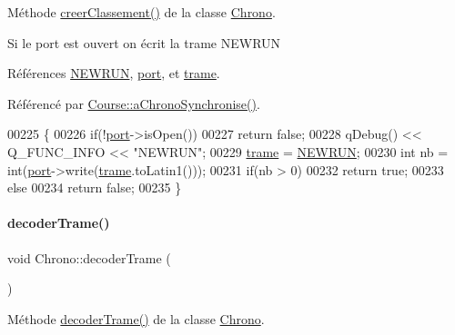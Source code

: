 Méthode \hyperlink{class_chrono_a0d7e3e50fcef0f2b0b7bfadc3d4f737d}{creer\+Classement()} de la classe \hyperlink{class_chrono}{Chrono}. 

Si le port est ouvert on écrit la trame N\+E\+W\+R\+UN 

Références \hyperlink{chrono_8h_a4dcfb7100df159ff3082add0247cd3ee}{N\+E\+W\+R\+UN}, \hyperlink{class_chrono_aca5fbe0eebd7f876f954d4a99c564167}{port}, et \hyperlink{class_chrono_a26f2155aa6e5ef4296e5456b64a713b5}{trame}.



Référencé par \hyperlink{class_course_a90c66d620f0726d92c40069f052e0cd0}{Course\+::a\+Chrono\+Synchronise()}.


\begin{DoxyCode}
00225 \{
00226     \textcolor{keywordflow}{if}(!\hyperlink{class_chrono_aca5fbe0eebd7f876f954d4a99c564167}{port}->isOpen())
00227         \textcolor{keywordflow}{return} \textcolor{keyword}{false};
00228     qDebug() << Q\_FUNC\_INFO << \textcolor{stringliteral}{"NEWRUN"};
00229     \hyperlink{class_chrono_a26f2155aa6e5ef4296e5456b64a713b5}{trame} = \hyperlink{chrono_8h_a4dcfb7100df159ff3082add0247cd3ee}{NEWRUN};
00230     \textcolor{keywordtype}{int} nb = int(\hyperlink{class_chrono_aca5fbe0eebd7f876f954d4a99c564167}{port}->write(\hyperlink{class_chrono_a26f2155aa6e5ef4296e5456b64a713b5}{trame}.toLatin1()));
00231     \textcolor{keywordflow}{if}(nb > 0)
00232         \textcolor{keywordflow}{return} \textcolor{keyword}{true};
00233     \textcolor{keywordflow}{else}
00234         \textcolor{keywordflow}{return} \textcolor{keyword}{false};
00235 \}
\end{DoxyCode}
\mbox{\label{class_chrono_a9a66b4e81385e2c354805548b94cdfb6}} 
\paragraph{\texorpdfstring{decoder\+Trame()}{decoderTrame()}}
{\footnotesize\ttfamily void Chrono\+::decoder\+Trame (\begin{DoxyParamCaption}{ }\end{DoxyParamCaption})\hspace{0.3cm}{\ttfamily [private]}}



Méthode \hyperlink{class_chrono_a9a66b4e81385e2c354805548b94cdfb6}{decoder\+Trame()} de la classe \hyperlink{class_chrono}{Chrono}. 

